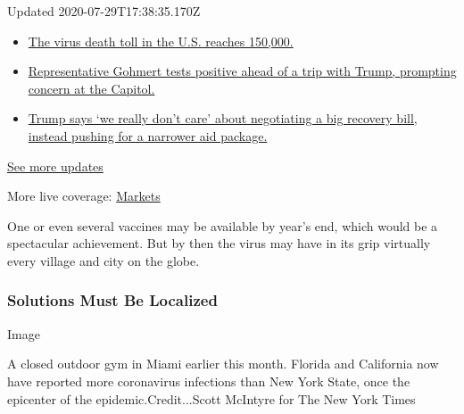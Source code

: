 Updated 2020-07-29T17:38:35.170Z

\begin{itemize}
\tightlist
\item
  \href{https://www.nytimes3xbfgragh.onion/2020/07/29/world/coronavirus-covid-19.html?action=click\&pgtype=Article\&state=default\&region=MAIN_CONTENT_1\&context=storylines_live_updates\#link-1fc03c4a}{The
  virus death toll in the U.S. reaches 150,000.}
\item
  \href{https://www.nytimes3xbfgragh.onion/2020/07/29/world/coronavirus-covid-19.html?action=click\&pgtype=Article\&state=default\&region=MAIN_CONTENT_1\&context=storylines_live_updates\#link-662712eb}{Representative
  Gohmert tests positive ahead of a trip with Trump, prompting concern
  at the Capitol.}
\item
  \href{https://www.nytimes3xbfgragh.onion/2020/07/29/world/coronavirus-covid-19.html?action=click\&pgtype=Article\&state=default\&region=MAIN_CONTENT_1\&context=storylines_live_updates\#link-73760ee2}{Trump
  says `we really don't care' about negotiating a big recovery bill,
  instead pushing for a narrower aid package.}
\end{itemize}

\href{https://www.nytimes3xbfgragh.onion/2020/07/29/world/coronavirus-covid-19.html?action=click\&pgtype=Article\&state=default\&region=MAIN_CONTENT_1\&context=storylines_live_updates}{See
more updates}

More live coverage:
\href{https://www.nytimes3xbfgragh.onion/live/2020/07/29/business/stock-market-today-coronavirus?action=click\&pgtype=Article\&state=default\&region=MAIN_CONTENT_1\&context=storylines_live_updates}{Markets}

One or even several vaccines may be available by year's end, which would
be a spectacular achievement. But by then the virus may have in its grip
virtually every village and city on the globe.

\hypertarget{solutions-must-be-localized}{%
\subsubsection{Solutions Must Be
Localized}\label{solutions-must-be-localized}}

Image

A closed outdoor gym in Miami earlier this month. Florida and California
now have reported more coronavirus infections than New York State, once
the epicenter of the epidemic.Credit...Scott McIntyre for The New York
Times


